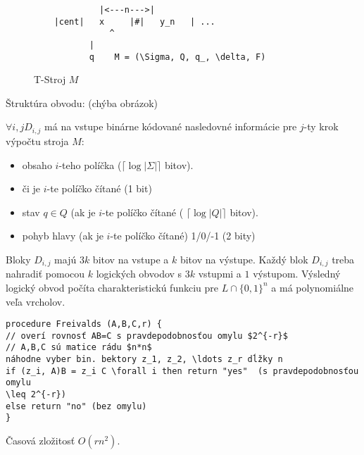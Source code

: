 \documentclass{article}
\begin{document}
\begin{figure}[h]
\begin{verbatim}
             |<---n--->|
	|cent|   x     |#|   y_n   | ... 
               ^
	       |
	       q 	M = (\Sigma, Q, q_, \delta, F)                
\end{verbatim}
\caption{T-Stroj $M$}
\end{figure}
Štruktúra obvodu:
(chýba obrázok)

$\forall i,j D_{i,j}$ má na vstupe binárne kódované nasledovné informácie pre
$j$-ty krok výpočtu stroja $M$:
\begin{itemize}
	\item obsaho $i$-teho políčka  ($\lceil \log |\Sigma| \rceil$ bitov).
	\item či je $i$-te políčko čítané (1 bit)
	\item stav $q \in Q$ (ak je $i$-te políčko čítané ( $\lceil \log
	|Q|\rceil$ bitov).
	\item pohyb hlavy  (ak je $i$-te políčko čítané) 1/0/-1 (2 bity)
\end{itemize}

Bloky $D_{i,j}$ majú $3k$ bitov na vstupe a $k$  bitov na výstupe. Každý blok
$D_{i,j}$ treba nahradiť pomocou $k$ logických obvodov s $3k$ vstupmi a $1$
výstupom. Výsledný logický obvod  počíta charakteristickú funkciu pre $L \cap
\{0,1\}^n$ a má polynomiálne veľa vrcholov.

\begin{verbatim}
procedure Freivalds (A,B,C,r) {
// overí rovnosť AB=C s pravdepodobnosťou omylu $2^{-r}$
// A,B,C sú matice rádu $n*n$
náhodne vyber bin. bektory z_1, z_2, \ldots z_r dĺžky n
if (z_i, A)B = z_i C \forall i then return "yes"  (s pravdepodobnosťou omylu
\leq 2^{-r})
else return "no" (bez omylu)
}
\end{verbatim}

Časová zložitosť $O(rn^2)$.
\end{document}
